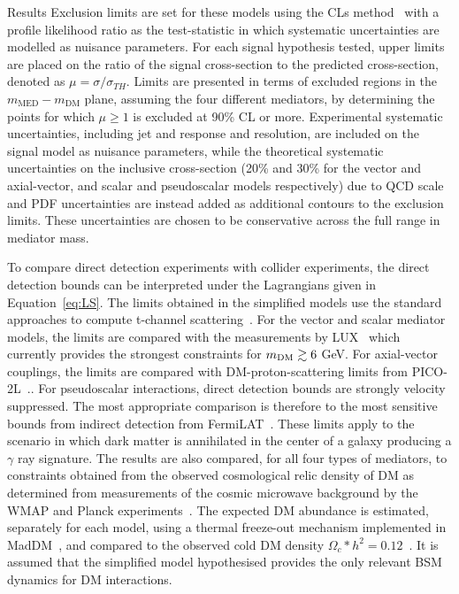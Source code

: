 \begin{section}{Results}
Exclusion limits are set for these models using the CLs method~\cite{cls} with a profile likelihood ratio as the 
test-statistic in which systematic uncertainties are modelled as nuisance parameters. 
For each signal hypothesis tested, upper limits are placed on the ratio of 
the signal cross-section to the predicted cross-section, denoted as $\mu=\sigma/\sigma_{TH}$. Limits are presented in terms of excluded regions in the 
$m_{\mathrm{MED}}-m_{\textrm{DM}}$ plane, assuming the four different mediators, by determining the points for which $\mu\ge1$ is excluded at 90\% CL or more.
Experimental systematic uncertainties, including jet and \ETm response and resolution, are included on the signal model as nuisance parameters, while the
theoretical systematic uncertainties on the inclusive cross-section (20\% and 30\% for the vector and axial-vector, and scalar and pseudoscalar models respectively) due to QCD scale and 
PDF uncertainties are instead added as additional contours to the exclusion limits. These uncertainties are chosen to be conservative across the full range in mediator mass.

To compare direct detection experiments with collider experiments, the direct detection bounds can be interpreted under the Lagrangians given in Equation~\ref{eq:LS}. The limits obtained in 
the simplified models use the standard approaches to compute t-channel scattering~\cite{Kurylov:2003ra,Hisano:2010ct, Cheung:2013pfa,Buchmueller:2014yoa}. 
For the vector and scalar mediator models, the limits are compared with the measurements by LUX~\cite{Akerib:2012ys,Akerib:2013tjd,Szydagis:2014xog} which currently 
provides the strongest constraints for $m_{\rm{DM}} \gtrsim 6$ GeV. For axial-vector couplings, the limits are compared with 
DM-proton-scattering limits from PICO-2L~\cite{Amole:2015lsj}..
For pseudoscalar interactions, direct detection bounds are strongly velocity suppressed. 
The most appropriate comparison is therefore to the most sensitive bounds from indirect detection from FermiLAT~\cite{Ackermann:2011wa,Abdo:2010ex}. 
These limits apply to the scenario in which dark matter is annihilated in the center of a galaxy producing a $\gamma$ ray signature. 
The results are also compared, for all four types of mediators, to constraints obtained from the observed cosmological relic density of DM as determined from 
measurements of the cosmic microwave background by the WMAP and Planck experiments~\cite{Bennett:2003ba,Planck:2006aa}. The expected DM abundance is estimated, separately for each
model, using a thermal freeze-out mechanism implemented in MadDM~\cite{Backovic:2013dpa}, and compared to the observed cold DM density $\Omega_c*h^2=0.12$~\cite{Ade:2013zuv}. 
It is assumed that the simplified model hypothesised provides the only relevant BSM dynamics for DM interactions.


\end{section}
